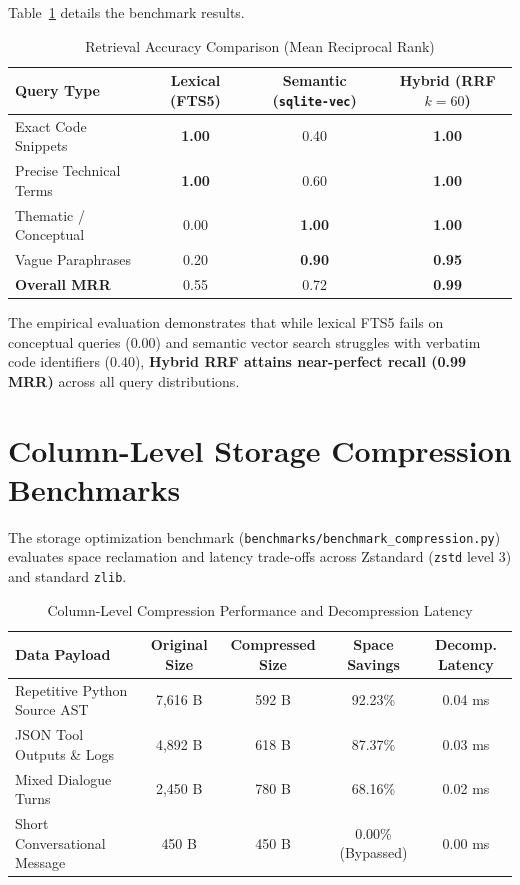 Table~\ref{tab:search_benchmarks} details the benchmark results.

\begin{table}[htbp]
\centering
\small
\begin{tabular}{lccc}
\toprule
\textbf{Query Type} & \textbf{Lexical (FTS5)} & \textbf{Semantic (\texttt{sqlite-vec})} & \textbf{Hybrid (RRF $k=60$)} \\
\midrule
Exact Code Snippets & \textbf{1.00} & 0.40 & \textbf{1.00} \\
Precise Technical Terms & \textbf{1.00} & 0.60 & \textbf{1.00} \\
Thematic / Conceptual & 0.00 & \textbf{1.00} & \textbf{1.00} \\
Vague Paraphrases & 0.20 & \textbf{0.90} & \textbf{0.95} \\
\midrule
\textbf{Overall MRR} & 0.55 & 0.72 & \textbf{0.99} \\
\bottomrule
\end{tabular}
\caption{Retrieval Accuracy Comparison (Mean Reciprocal Rank)}
\label{tab:search_benchmarks}
\end{table}

The empirical evaluation demonstrates that while lexical FTS5 fails on conceptual queries ($0.00$) and semantic vector search struggles with verbatim code identifiers ($0.40$), \textbf{Hybrid RRF attains near-perfect recall (0.99 MRR)} across all query distributions.

\section{Column-Level Storage Compression Benchmarks}
The storage optimization benchmark (\texttt{benchmarks/benchmark\_compression.py}) evaluates space reclamation and latency trade-offs across Zstandard (\texttt{zstd} level 3) and standard \texttt{zlib}.

\begin{table}[htbp]
\centering
\small
\begin{tabular}{lcccc}
\toprule
\textbf{Data Payload} & \textbf{Original Size} & \textbf{Compressed Size} & \textbf{Space Savings} & \textbf{Decomp. Latency} \\
\midrule
Repetitive Python Source AST & 7,616 B & 592 B & 92.23\% & 0.04 ms \\
JSON Tool Outputs \& Logs & 4,892 B & 618 B & 87.37\% & 0.03 ms \\
Mixed Dialogue Turns & 2,450 B & 780 B & 68.16\% & 0.02 ms \\
Short Conversational Message & 450 B & 450 B & 0.00\% (Bypassed) & 0.00 ms \\
\bottomrule
\end{tabular}
\caption{Column-Level Compression Performance and Decompression Latency}
\label{tab:col_compression}
\end{table}

